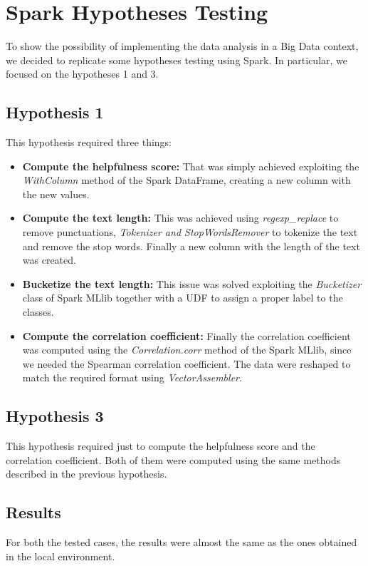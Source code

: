 \section{Spark Hypotheses Testing}
To show the possibility of implementing the data analysis in a Big Data context, we decided to replicate some hypotheses
testing using Spark. In particular, we focused on the hypotheses 1 and 3.

\subsection*{Hypothesis 1}
This hypothesis required three things:

\begin{itemize}[leftmargin=*, noitemsep]
\item \textbf{Compute the helpfulness score:}
That was simply achieved exploiting the \textit{WithColumn} method of the Spark DataFrame, creating a new column with the new values.

\item \textbf{Compute the text length:}
This was achieved using \textit{regexp\_replace} to remove punctuations, \textit{Tokenizer and StopWordsRemover} to tokenize the 
text and remove the stop words. Finally a new column with the length of the text was created.

\item \textbf{Bucketize the text length:}
This issue was solved exploiting the \textit{Bucketizer} class of Spark MLlib together with a UDF to assign
a proper label to the classes.

\item \textbf{Compute the correlation coefficient:}
Finally the correlation coefficient was computed using the \textit{Correlation.corr} method of the Spark MLlib, since
we needed the Spearman correlation coefficient. The data were reshaped to match the required format using \textit{VectorAssembler}.

\end{itemize}

\subsection*{Hypothesis 3}
This hypothesis required just to compute the helpfulness score and the correlation coefficient. Both of them were computed
using the same methods described in the previous hypothesis. 

\subsection*{Results}
For both the tested cases, the results were almost the same as the ones obtained in the local environment.
